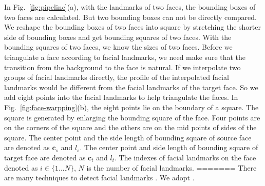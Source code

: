 In Fig.~\ref{fig:pipeline}(a), with the landmarks of two faces, the bounding boxes of two faces are calculated. But two bounding boxes can not be directly compared.
We reshape the bounding boxes of two faces into square by stretching the shorter side of bounding boxes and get bounding squares of two faces.
With the bounding squares of two faces, we know the sizes of two faces.
%
%
Before we triangulate a face according to facial landmarks, we need make sure that the transition from the background to the face is natural. If we interpolate two groups of facial landmarks directly, the profile of the interpolated facial landmarks would be different from the facial landmarks of the target face.
%
So we add eight points into the facial landmarks to help triangulate the faces. In Fig.~\ref{fig:face-warpping}(b), the eight points lie on the boundary of a square. The square is generated by enlarging the bounding square of the face. Four points are on the corners of the square and the others are on the mid points of sides of the square.
%
The center point and the side length of bounding square of source face are denoted as $\mathbf{c}_s$ and $l_s$.
The center point and side length of bounding square of target face are denoted as $\mathbf{c}_t$ and $l_t$.
%
The indexes of facial landmarks on the face denoted as $i \in \{1...N\}$, $N$ is the number of facial landmarks.
=======
There are many techniques to detect facial landmarks \cite{fld2,fld3,fld4,fld}. We adopt \cite{fld}. 

